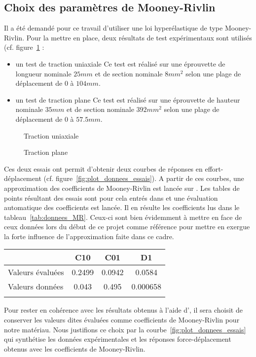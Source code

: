 ﻿\documentclass{article}
\newcommand{\abaqus}{\bsc{Abaqus}\xspace}
\begin{document}
\subsection{Choix des paramètres de Mooney-Rivlin}

Il a été demandé pour ce travail d'utiliser une loi hyperélastique de type Mooney-Rivlin. Pour la mettre en place, deux résultats de test expérimentaux sont utilisés (cf. figure~\ref{fig:essais_exp} : 
\begin{itemize}
\item un test de traction uniaxiale
Ce test est réalisé sur une éprouvette de longueur nominale $25 mm$ et de section nominale $8 mm^2$ selon une plage de déplacement de $0$ à $104 mm$.
\item un test de traction plane
Ce test est réalisé sur une éprouvette de hauteur nominale $35 mm$ et de section nominale $392 mm^2$ selon une plage de déplacement de $0$ à $57.5 mm$.
\end{itemize}

\begin{figure}
\caption{Traction uniaxiale}
\caption{Traction plane}
\label{fig:essais_exp}
\end{figure}

Ces deux essais ont permit d'obtenir deux courbes de réponses en effort-déplacement (cf. figure~\ref{fig:plot_donnees_essais}). A partir de ces courbes, une approximation des coefficients de Mooney-Rivlin est lancée sur \abaqus. Les tables de points résultant des essais sont pour cela entrés dans \abaqus et une évaluation automatique des coefficients est lancée. Il en résulte les coefficients lus dans le tableau~\ref{tab:donnees_MR}. Ceux-ci sont bien évidemment à mettre en face de ceux données lors du début de ce projet comme référence pour mettre en exergue la forte influence de l'approximation faite dans ce cadre.

\begin{tabular}{|l|c|c|c|}
\hline
 & C10 & C01 & D1 \\ \hline
Valeurs évaluées & 0.2499 & 0.0942 & 0.0584 \\ \hline
Valeurs données & 0.043  & 0.495 & 0.000658 \\ \hline
\label{tab:donnees_MR}
\end{tabular} 

Pour rester en cohérence avec les résultats obtenus à l'aide d'\abaqus, il sera choisit de conserver les valeurs dites évaluées comme coefficients de Mooney-Rivlin pour notre matériau. Nous justifions ce choix par la courbe~\ref{fig:plot_donnees_essais} qui synthétise les données expérimentales et les réponses force-déplacement obtenus avec les coefficients de Mooney-Rivlin.
\end{document}
